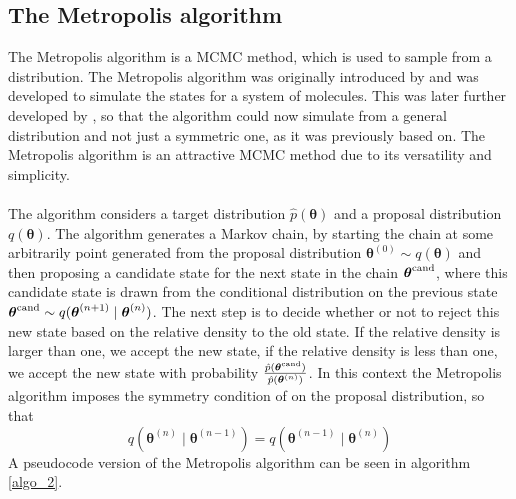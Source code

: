 \subsection{The Metropolis algorithm} \label{sec:Metropolis}
The Metropolis algorithm is a MCMC method, which is used to sample from a distribution. 
The Metropolis algorithm was originally introduced by \cite{Metropolis1953} and was developed to simulate the states for a system of molecules. This was later further developed by \cite{hastings70}, so that the algorithm could now simulate from a general distribution and not just a symmetric one, as it was previously based on. The Metropolis algorithm is an attractive MCMC method due to its versatility and simplicity.\\
\\
The algorithm considers a target distribution $\hat{p}(\boldsymbol{\theta})$ and a proposal distribution $q(\boldsymbol{\theta})$. The algorithm generates a Markov chain, by starting the chain at some arbitrarily point generated from the proposal distribution $\boldsymbol{\theta}^{(0)}\sim q(\boldsymbol{\theta})$ and then proposing a candidate state for the next state in the chain $\boldsymbol{\theta}^{\text{\text{cand}}}$, where this candidate state is drawn from the conditional distribution on the previous state $\boldsymbol{\theta}^{\text{\text{cand}}}\sim q(\boldsymbol{\theta}^{(n+1)}\mid\boldsymbol{\theta}^{(n)})$. The next step is to decide whether or not to reject this new state based on the relative density to the old state. If the relative density is larger than one, we accept the new state, if the relative density is less than one, we accept the new state with probability $\frac{\hat{p}(\boldsymbol{\theta}^{\text{\text{cand}}})}{\hat{p}(\boldsymbol{\theta}^{(n)})}$. In this context the Metropolis algorithm imposes the symmetry condition of on the proposal distribution, so that
\begin{equation*}
    q(\boldsymbol{\theta}^{(n)}\mid \boldsymbol{\theta}^{(n-1)})=q(\boldsymbol{\theta}^{(n-1)}\mid \boldsymbol{\theta}^{(n)})
\end{equation*}
A pseudocode version of the Metropolis algorithm can be seen in algorithm \ref{algo_2}.
